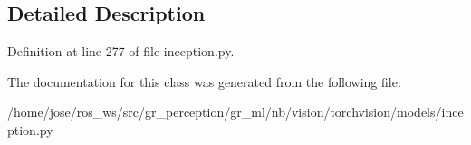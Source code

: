 \subsection{Detailed Description}


Definition at line 277 of file inception.\+py.



The documentation for this class was generated from the following file\+:\begin{DoxyCompactItemize}
\item 
/home/jose/ros\+\_\+ws/src/gr\+\_\+perception/gr\+\_\+ml/nb/vision/torchvision/models/inception.\+py\end{DoxyCompactItemize}
